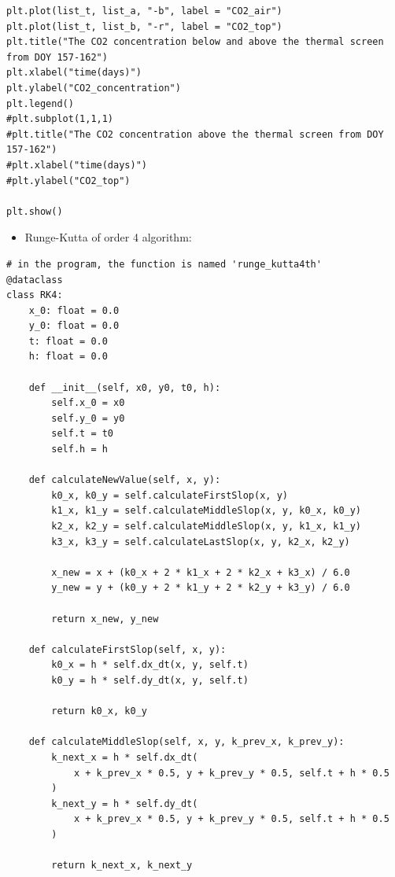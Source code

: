 \documentclass[a4paper]{article}
\numberwithin{equation}{section}
\begin{document}
\begin{mdframed}[leftline=false,rightline=false,backgroundcolor=cyan!10,nobreak=false]
\begin{verbatim}
plt.plot(list_t, list_a, "-b", label = "CO2_air")
plt.plot(list_t, list_b, "-r", label = "CO2_top")
plt.title("The CO2 concentration below and above the thermal screen from DOY 157-162")
plt.xlabel("time(days)")
plt.ylabel("CO2_concentration")
plt.legend()
#plt.subplot(1,1,1)
#plt.title("The CO2 concentration above the thermal screen from DOY 157-162")
#plt.xlabel("time(days)")
#plt.ylabel("CO2_top")

plt.show()
\end{verbatim}
\end{mdframed}



\begin{itemize}
    \item Runge-Kutta of order 4 algorithm:
\end{itemize}
\begin{mdframed}[leftline=false,rightline=false,backgroundcolor=cyan!10,nobreak=false]
  \begin{verbatim}
# in the program, the function is named 'runge_kutta4th'
@dataclass
class RK4:
    x_0: float = 0.0
    y_0: float = 0.0
    t: float = 0.0
    h: float = 0.0

    def __init__(self, x0, y0, t0, h):
        self.x_0 = x0
        self.y_0 = y0
        self.t = t0
        self.h = h

    def calculateNewValue(self, x, y):
        k0_x, k0_y = self.calculateFirstSlop(x, y)
        k1_x, k1_y = self.calculateMiddleSlop(x, y, k0_x, k0_y)
        k2_x, k2_y = self.calculateMiddleSlop(x, y, k1_x, k1_y)
        k3_x, k3_y = self.calculateLastSlop(x, y, k2_x, k2_y)

        x_new = x + (k0_x + 2 * k1_x + 2 * k2_x + k3_x) / 6.0
        y_new = y + (k0_y + 2 * k1_y + 2 * k2_y + k3_y) / 6.0

        return x_new, y_new

    def calculateFirstSlop(self, x, y):
        k0_x = h * self.dx_dt(x, y, self.t)
        k0_y = h * self.dy_dt(x, y, self.t)

        return k0_x, k0_y

    def calculateMiddleSlop(self, x, y, k_prev_x, k_prev_y):
        k_next_x = h * self.dx_dt(
            x + k_prev_x * 0.5, y + k_prev_y * 0.5, self.t + h * 0.5
        )
        k_next_y = h * self.dy_dt(
            x + k_prev_x * 0.5, y + k_prev_y * 0.5, self.t + h * 0.5
        )

        return k_next_x, k_next_y


\end{verbatim}
\end{mdframed}
\end{document}
